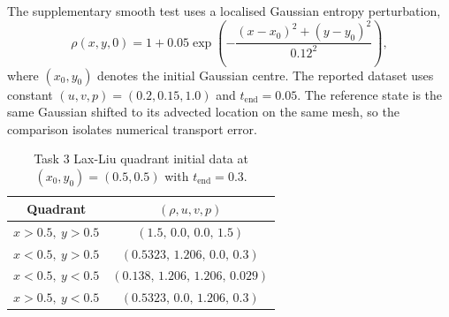 \documentclass[final,3p,times,twocolumn]{elsarticle}
\newif\ifwithpaths
\DeclareRobustCommand{\pathnote}[1]{\ifwithpaths\textit{ [source: \nolinkurl{#1}]}\fi}
\begin{document}
\begin{table}[!htbp]
\centering
\scriptsize
{}
\caption{Toro states used in Tasks 1 and 2; all cases use $\gamma=1.4$ and zero tangential velocity in the underlying 1D data.\pathnote{Euler_AmrLevel/Exec/Euler1D/Prob.cpp}}
\label{tab:toro_initial_data}
\end{table}

The supplementary smooth test uses a localised Gaussian entropy perturbation,
\begin{equation}
\rho(x,y,0)=1+0.05\exp\!\left(-\frac{(x-x_0)^2+(y-y_0)^2}{0.12^2}\right),
\end{equation}
where $(x_0,y_0)$ denotes the initial Gaussian centre. The reported dataset uses constant $(u,v,p)=(0.2,0.15,1.0)$ and $t_\mathrm{end}=0.05$. The reference state is the same Gaussian shifted to its advected location on the same mesh, so the comparison isolates numerical transport error.

\begin{table}[!htbp]
\centering
\scriptsize
\begin{tabular}{@{}c c@{}}
\hline
Quadrant & $(\rho,u,v,p)$ \\
\hline
$x>0.5,\ y>0.5$ & $(1.5,\,0.0,\,0.0,\,1.5)$ \\
$x<0.5,\ y>0.5$ & $(0.5323,\,1.206,\,0.0,\,0.3)$ \\
$x<0.5,\ y<0.5$ & $(0.138,\,1.206,\,1.206,\,0.029)$ \\
$x>0.5,\ y<0.5$ & $(0.5323,\,0.0,\,1.206,\,0.3)$ \\
\hline
\end{tabular}
\caption{Task 3 Lax-Liu quadrant initial data at $(x_0,y_0)=(0.5,0.5)$ with $t_\mathrm{end}=0.3$.\pathnote{Euler_AmrLevel/Exec/Euler1D/Prob.cpp}}
\label{tab:quadrant_initial_data}
\end{table}
\end{document}
